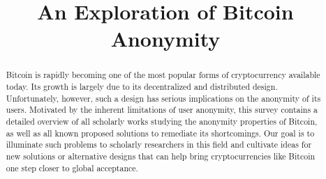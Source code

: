 \documentclass[conference]{IEEEtran}
\begin{document}
\title{An Exploration of Bitcoin Anonymity}


\author{
\and
{}
}

\maketitle

\begin{abstract}
Bitcoin is rapidly becoming one of the most popular forms of cryptocurrency available today. Its growth is largely due to its decentralized and distributed design. Unfortunately, however, such a design has serious implications on the anonymity of its users. Motivated by the inherent limitations of user anonymity, this survey contains a detailed overview of all scholarly works studying the anonymity properties of Bitcoin, as well as all known proposed solutions to remediate its shortcomings. Our goal is to illuminate such problems to scholarly researchers in this field and cultivate ideas for new solutions or alternative designs that can help bring cryptocurrencies like Bitcoin one step closer to global acceptance.
\end{abstract}

\IEEEpeerreviewmaketitle








\end{document}
